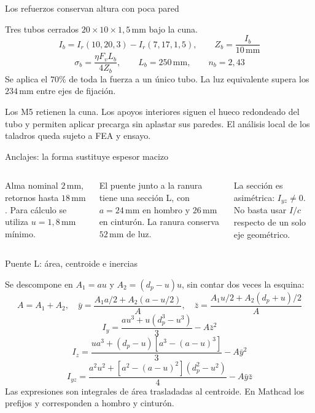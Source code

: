 \documentclass[10pt,aspectratio=169]{beamer}
\newcommand{\mc}[1]{\texttt{\detokenize{#1}}}
\newcommand{\mm}{\,\mathrm{mm}}
\newcommand{\mcref}{Guía de diseño}
\begin{document}
\gdef\mcref{Mathcad: sección 12 / pág. 16}
\begin{frame}[t]{Los refuerzos conservan altura con poca pared}

Tres tubos cerrados $20\times10\times1{,}5\mm$ bajo la cuna.
\[
I_b=I_r(10,20,3)-I_r(7,17,1{,}5),\qquad Z_b=\frac{I_b}{10\mm}
\]
\[
\sigma_b=\frac{\eta F_v L_b}{4Z_b},\qquad L_b=250\mm,
\qquad n_b=2{,}43
\]
Se aplica el $70\%$ de toda la fuerza a un único tubo. La luz equivalente supera los $234\mm$ entre ejes de fijación.

Los M5 retienen la cuna. Los apoyos interiores siguen el hueco redondeado del tubo y permiten aplicar precarga sin aplastar sus paredes. El análisis local de los taladros queda sujeto a FEA y ensayo.

\end{frame}

\gdef\mcref{Mathcad: sección 13 / pág. 17}
\begin{frame}[t]{Anclajes: la forma sustituye espesor macizo}

\begin{columns}[T,onlytextwidth]
Alma nominal $2\mm$, retornos hasta $18\mm$. Para cálculo se utiliza $u=1{,}8\mm$ mínimo.

El puente junto a la ranura tiene una sección L, con $a=24\mm$ en hombro y $26\mm$ en cinturón. La ranura conserva $52\mm$ de luz.

La sección es asimétrica: $I_{yz}\ne0$. No basta usar $I/c$ respecto de un solo eje geométrico.
\end{columns}

\end{frame}

\gdef\mcref{Mathcad: sección 14 / pág. 18-20}
\begin{frame}[t]{Puente L: área, centroide e inercias}

\small
Se descompone en $A_1=au$ y $A_2=(d_p-u)u$, sin contar dos veces la esquina:
\[
A=A_1+A_2,\quad
\bar y=\frac{A_1a/2+A_2(a-u/2)}A,\quad
\bar z=\frac{A_1u/2+A_2(d_p+u)/2}A
\]
\[
I_y=\frac{au^3+u(d_p^3-u^3)}3-A\bar z^2
\]
\[
I_z=\frac{ua^3+(d_p-u)[a^3-(a-u)^3]}3-A\bar y^2
\]
\[
I_{yz}=\frac{a^2u^2+[a^2-(a-u)^2](d_p^2-u^2)}4-A\bar y\bar z
\]
Las expresiones son integrales de área trasladadas al centroide. En Mathcad los prefijos \mc{Ls} y \mc{Lb} corresponden a hombro y cinturón.

\end{frame}
\end{document}
